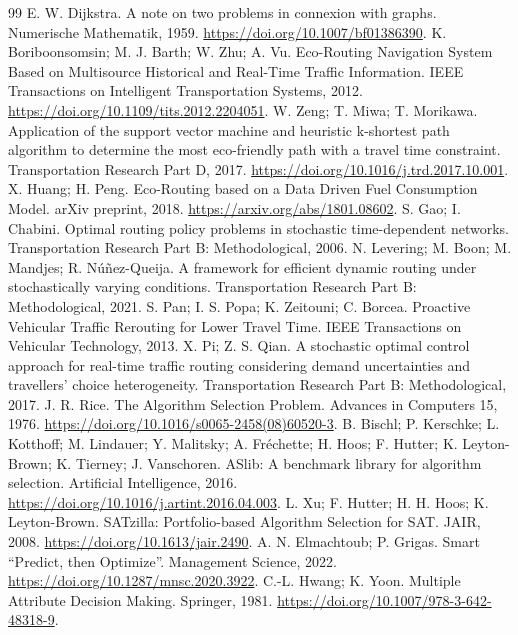 \documentclass[10pt,a4paper]{article}
\begin{document}
\begin{thebibliography}{99}
\small\setlength{\itemsep}{2pt}\setlength{\parskip}{0pt}
 E. W. Dijkstra. A note on two problems in connexion with graphs. Numerische Mathematik, 1959. \url{https://doi.org/10.1007/bf01386390}.
 K. Boriboonsomsin; M. J. Barth; W. Zhu; A. Vu. Eco-Routing Navigation System Based on Multisource Historical and Real-Time Traffic Information. IEEE Transactions on Intelligent Transportation Systems, 2012. \url{https://doi.org/10.1109/tits.2012.2204051}.
 W. Zeng; T. Miwa; T. Morikawa. Application of the support vector machine and heuristic k-shortest path algorithm to determine the most eco-friendly path with a travel time constraint. Transportation Research Part D, 2017. \url{https://doi.org/10.1016/j.trd.2017.10.001}.
 X. Huang; H. Peng. Eco-Routing based on a Data Driven Fuel Consumption Model. arXiv preprint, 2018. \url{https://arxiv.org/abs/1801.08602}.
 S. Gao; I. Chabini. Optimal routing policy problems in stochastic time-dependent networks. Transportation Research Part B: Methodological, 2006.
 N. Levering; M. Boon; M. Mandjes; R. N\'u\~nez-Queija. A framework for efficient dynamic routing under stochastically varying conditions. Transportation Research Part B: Methodological, 2021.
 S. Pan; I. S. Popa; K. Zeitouni; C. Borcea. Proactive Vehicular Traffic Rerouting for Lower Travel Time. IEEE Transactions on Vehicular Technology, 2013.
 X. Pi; Z. S. Qian. A stochastic optimal control approach for real-time traffic routing considering demand uncertainties and travellers' choice heterogeneity. Transportation Research Part B: Methodological, 2017.
 J. R. Rice. The Algorithm Selection Problem. Advances in Computers 15, 1976. \url{https://doi.org/10.1016/s0065-2458(08)60520-3}.
 B. Bischl; P. Kerschke; L. Kotthoff; M. Lindauer; Y. Malitsky; A. Fr\'echette; H. Hoos; F. Hutter; K. Leyton-Brown; K. Tierney; J. Vanschoren. ASlib: A benchmark library for algorithm selection. Artificial Intelligence, 2016. \url{https://doi.org/10.1016/j.artint.2016.04.003}.
 L. Xu; F. Hutter; H. H. Hoos; K. Leyton-Brown. SATzilla: Portfolio-based Algorithm Selection for SAT. JAIR, 2008. \url{https://doi.org/10.1613/jair.2490}.
 A. N. Elmachtoub; P. Grigas. Smart ``Predict, then Optimize''. Management Science, 2022. \url{https://doi.org/10.1287/mnsc.2020.3922}.
 C.-L. Hwang; K. Yoon. Multiple Attribute Decision Making. Springer, 1981. \url{https://doi.org/10.1007/978-3-642-48318-9}.

\end{thebibliography}
\end{document}
